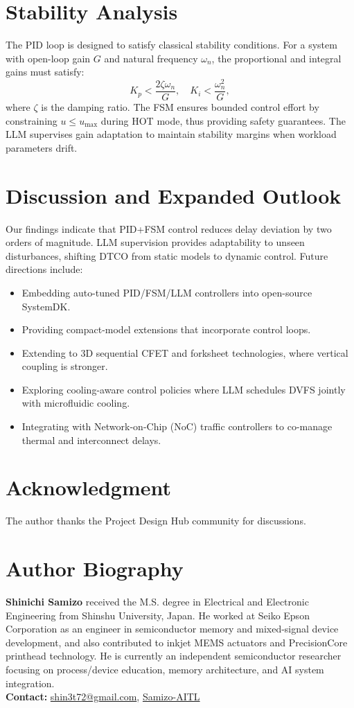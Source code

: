 \documentclass[conference]{IEEEtran}
\begin{document}
\section{Stability Analysis}
The PID loop is designed to satisfy classical stability conditions.
For a system with open-loop gain $G$ and natural frequency $\omega_n$,
the proportional and integral gains must satisfy:
\begin{equation}
K_p < \frac{2\zeta\omega_n}{G}, \quad
K_i < \frac{\omega_n^2}{G},
\end{equation}
where $\zeta$ is the damping ratio.
The FSM ensures bounded control effort by constraining
$u \leq u_{\max}$ during HOT mode,
thus providing safety guarantees.
The LLM supervises gain adaptation to maintain stability margins
when workload parameters drift.

\section{Discussion and Expanded Outlook}
Our findings indicate that PID+FSM control reduces delay deviation
by two orders of magnitude. LLM supervision provides adaptability to
unseen disturbances, shifting DTCO from static models to dynamic control.
Future directions include:
\begin{itemize}
  \item Embedding auto-tuned PID/FSM/LLM controllers into open-source SystemDK.
  \item Providing compact-model extensions that incorporate control loops.
  \item Extending to 3D sequential CFET and forksheet technologies,
  where vertical coupling is stronger.
  \item Exploring cooling-aware control policies where LLM schedules
  DVFS jointly with microfluidic cooling.
  \item Integrating with Network-on-Chip (NoC) traffic controllers
  to co-manage thermal and interconnect delays.
\end{itemize}

\section*{Acknowledgment}
The author thanks the Project Design Hub community for discussions.




\section*{Author Biography}
\noindent\textbf{Shinichi Samizo}
received the M.S. degree in Electrical and Electronic Engineering from Shinshu University, Japan.
He worked at Seiko Epson Corporation as an engineer in semiconductor memory and mixed-signal device development,
and also contributed to inkjet MEMS actuators and PrecisionCore printhead technology.
He is currently an independent semiconductor researcher focusing on process/device education,
memory architecture, and AI system integration.\\[2pt]
\textbf{Contact:} \href{mailto:shin3t72@gmail.com}{shin3t72@gmail.com},
\href{https://github.com/Samizo-AITL}{Samizo-AITL}
\end{document}
